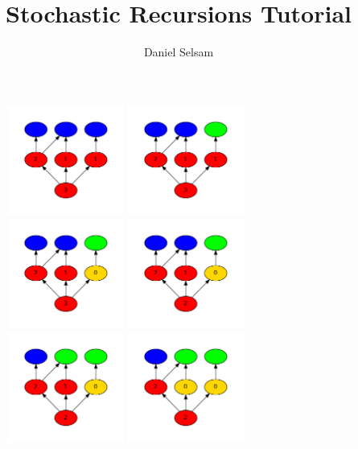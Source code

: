 \documentclass[12pt]{article}
\title{Stochastic Recursions Tutorial}
\author{Daniel Selsam}
\date{}
\begin{document}
\maketitle


\begin{figure}
\hspace{-0.5in}
\includegraphics[width=1.5in]{tutorial_1/dot1.pdf}
\includegraphics[width=1.5in]{tutorial_1/dot2.pdf}
\includegraphics[width=1.5in]{tutorial_1/dot3.pdf}
\includegraphics[width=1.5in]{tutorial_1/dot4.pdf}
\includegraphics[width=1.5in]{tutorial_1/dot5.pdf}
\includegraphics[width=1.5in]{tutorial_1/dot6.pdf}

\end{figure}
\end{document}
